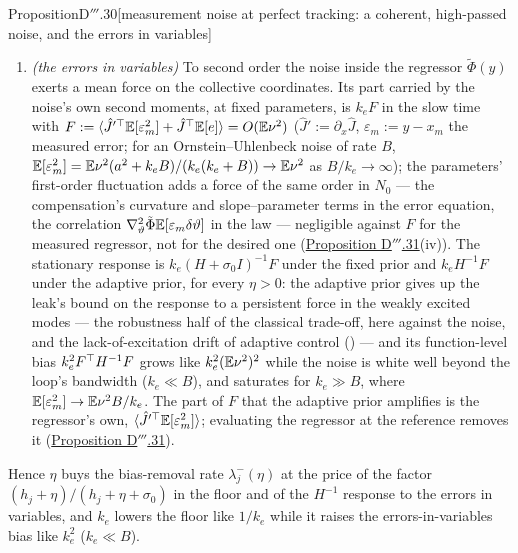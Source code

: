 \begin{thm}{Proposition}{D$'''$.30}[measurement noise at perfect tracking: a coherent, high-passed noise, and the
errors in variables]
\begin{enumerate}[label=\textup{(\roman*)}]
    plant's current point has $\langle\abs{\hat J}^4\rangle$ in place of $\tr H^2$). Mode $j$'s parameter variance is
    $(N_0/2k_e)Q_{jj}(h_j + \eta)/(h_j(h_j + \eta + \sigma_0))$ --- from $Q_{jj}/(2(h_j + \sigma_0))$ to
    $Q_{jj}/(2h_j)$ in units of $N_0/k_e$ --- plus the fast part $(N_0/2k_e)h_j$.
  \item \emph{(the errors in variables)} To second order the noise inside the regressor $\tilde\Phi(y)$ exerts a mean
    force on the collective coordinates. Its part carried by the noise's own second moments, at fixed parameters, is
    $k_eF$ in the slow time with $F := \langle\hat J'^\top\mathbb{E}[\varepsilon_m^2] + \hat J^\top\mathbb{E}[e]\rangle = O(\mathbb{E}\nu^2)$
    ($\hat J' := \partial_x\hat J$, $\varepsilon_m := y - x_m$ the measured error; for an Ornstein--Uhlenbeck noise of
    rate $B$, $\mathbb{E}[\varepsilon_m^2] = \mathbb{E}\nu^2(a^2 + k_eB)/(k_e(k_e + B))\to\mathbb{E}\nu^2$ as $B/k_e\to\infty$); the
    parameters' first-order fluctuation adds a force of the same order in $N_0$ --- the compensation's curvature and
    slope--parameter terms in the error equation, the correlation
    $\nabla^2_\vartheta\tilde\Phi\mathbb{E}[\varepsilon_m\delta\vartheta]$ in the law --- negligible against $F$ for the
    measured regressor, not for the desired one (\hyperref[res:thmDppp:31]{Proposition D$'''$.31}(iv)). The
    stationary response is $k_e(H + \sigma_0I)^{-1}F$ under the fixed prior and $k_eH^{-1}F$ under the adaptive
    prior, for every $\eta > 0$: the adaptive prior gives up the leak's bound on the response to a persistent force
    in the weakly excited modes --- the robustness half of the classical trade-off, here against the noise, and the
    lack-of-excitation drift of adaptive control (\cite{S57}) --- and its function-level bias $k_e^2F^\top H^{-1}F$
    grows like $k_e^2(\mathbb{E}\nu^2)^2$ while the noise is white well beyond the loop's bandwidth ($k_e\ll B$), and
    saturates for $k_e\gg B$, where $\mathbb{E}[\varepsilon_m^2]\to\mathbb{E}\nu^2B/k_e$. The part of $F$ that the adaptive prior
    amplifies is the regressor's own, $\langle\hat J'^\top\mathbb{E}[\varepsilon_m^2]\rangle$; evaluating the regressor at the
    reference removes it (\hyperref[res:thmDppp:31]{Proposition D$'''$.31}).
\end{enumerate}
Hence $\eta$ buys the bias-removal rate $\lambda_j^-(\eta)$ at the price of the factor
$(h_j + \eta)/(h_j + \eta + \sigma_0)$ in the floor and of the $H^{-1}$ response to the errors in variables, and $k_e$
lowers the floor like $1/k_e$ while it raises the errors-in-variables bias like $k_e^2$ ($k_e\ll B$).
\end{thm}

